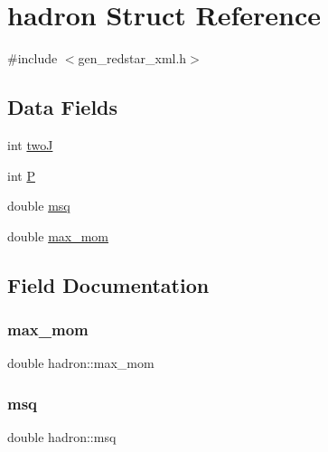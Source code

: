 \hypertarget{structhadron}{}\section{hadron Struct Reference}
\label{structhadron}


{\ttfamily \#include $<$gen\+\_\+redstar\+\_\+xml.\+h$>$}

\subsection*{Data Fields}
\begin{DoxyCompactItemize}
\item 
int \mbox{\hyperlink{structhadron_ae190a1452b80921c1fc32bbfb805ae9d}{twoJ}}
\item 
int \mbox{\hyperlink{structhadron_a317d83c6257a8452f70b2251ec784715}{P}}
\item 
double \mbox{\hyperlink{structhadron_aa32b931caa2971c559b462314a745d1a}{msq}}
\item 
double \mbox{\hyperlink{structhadron_a668b950b7a48e196a051668114687d70}{max\+\_\+mom}}
\end{DoxyCompactItemize}


\subsection{Field Documentation}
\mbox{\label{structhadron_a668b950b7a48e196a051668114687d70}} 
\subsubsection{\texorpdfstring{max\_mom}{max\_mom}}
{\footnotesize\ttfamily double hadron\+::max\+\_\+mom}

\mbox{\label{structhadron_aa32b931caa2971c559b462314a745d1a}} 
\subsubsection{\texorpdfstring{msq}{msq}}
{\footnotesize\ttfamily double hadron\+::msq}

\mbox{\label{structhadron_a317d83c6257a8452f70b2251ec784715}} 
